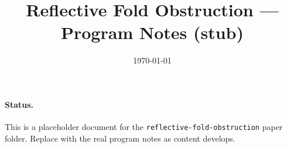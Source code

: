 \documentclass[11pt]{article}
\title{Reflective Fold Obstruction --- Program Notes (stub)}
\author{}
\date{\today}
\begin{document}
\maketitle

\paragraph{Status.}
This is a placeholder document for the \texttt{reflective-fold-obstruction} paper folder.
Replace with the real program notes as content develops.
\end{document}
